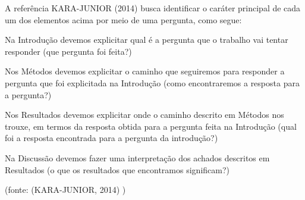 \documentclass[
12pt,		%
openright,	%
twoside,  %
a4paper,			%
chapter=TITLE,		%
english,			%
french,				%
spanish,			%
brazil				%
]{USPSC-classe/USPSC_RedarTex}
\begin{document}
A refer\^encia KARA-JUNIOR (2014) busca identificar o car\'ater principal de cada um dos elementos acima por meio de uma pergunta, como segue:









\begin{alineas}
\item Na Introdu\c{c}\~ao devemos explicitar qual \'e a pergunta que o trabalho vai tentar responder   (\textquotedbl que pergunta foi feita?\textquotedbl )
\item Nos M\'etodos devemos explicitar o caminho que seguiremos para responder a pergunta que foi explicitada na Introdu\c{c}\~ao (\textquotedbl como encontraremos a resposta para a pergunta?\textquotedbl )
\item Nos Resultados devemos explicitar onde o caminho descrito em M\'etodos nos trouxe, em termos da resposta obtida para a pergunta feita na Introdu\c{c}\~ao (\textquotedbl qual foi a resposta encontrada para a pergunta da introdu\c{c}\~ao?\textquotedbl )
\item Na Discuss\~ao devemos fazer uma interpreta\c{c}\~ao dos achados descritos em Resultados (\textquotedbl o que os resultados que encontramos significam?\textquotedbl )
\end{alineas}

\begin{flushright}
\setlength{\absparsep}{0pt}
\tiny \begin{flushright}
\setlength{\absparsep}{0pt}
\tiny \begin{flushright}
\setlength{\absparsep}{0pt}
\tiny \begin{flushright}
\setlength{\absparsep}{0pt}
\tiny \begin{flushright}
\setlength{\absparsep}{0pt}
\tiny \begin{flushright}
\setlength{\absparsep}{0pt}
\tiny \begin{flushright}
\setlength{\absparsep}{0pt}
\tiny \begin{flushright}
\setlength{\absparsep}{0pt}
\tiny (fonte:  (KARA-JUNIOR, 2014) ) \normalsize 
\end{flushright}

 \normalsize 
\end{flushright}

 \normalsize 
\end{flushright}

 \normalsize 
\end{flushright}

 \normalsize 
\end{flushright}

 \normalsize 
\end{flushright}

 \normalsize 
\end{flushright}

 \normalsize 
\end{flushright}
\end{document}
